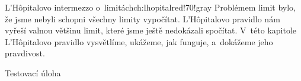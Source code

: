 \begin{chapterintro}{L'Hôpitalovo intermezzo o~limitách}{ch:lhopital}{red!70!gray}{}
    Problémem limit bylo, že jsme nebyli schopni všechny limity vypočítat.
    L'Hôpitalovo pravidlo nám vyřeší valnou většinu limit, které jsme ještě
    nedokázali spočítat. V~této kapitole L'Hôpitalovo pravidlo vysvětlíme, ukážeme,
    jak funguje, a~dokážeme jeho pravdivost.
\end{chapterintro}

\begin{exercise}
    Testovací úloha
\end{exercise}
